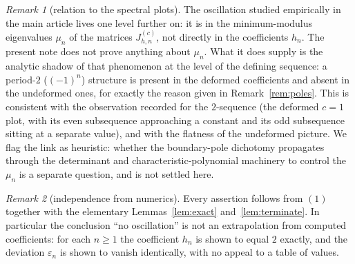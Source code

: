 \documentclass[11pt, fleqn]{amsart}
\theoremstyle{remark}
\newtheorem{remark}{Remark}
\begin{document}
\begin{remark}[relation to the spectral plots]\label{rem:spectral}
The oscillation studied empirically in the main article lives one level further on: it
is in the minimum-modulus eigenvalues $\mu_n$ of the matrices $J^{(c)}_{h,n}$, not
directly in the coefficients $h_n$. The present note does not prove anything about
$\mu_n$. What it does supply is the analytic shadow of that phenomenon at the level of
the defining sequence: a period-$2$ ($(-1)^n$) structure is present in the deformed
coefficients and absent in the undeformed ones, for exactly the reason given in
Remark~\ref{rem:poles}. This is consistent with the observation recorded for the
$2$-sequence (the deformed $c=1$ plot, with its even subsequence approaching a constant
and its odd subsequence sitting at a separate value), and with the flatness of the
undeformed picture. We flag the link as heuristic: whether the boundary-pole dichotomy
propagates through the determinant and characteristic-polynomial machinery to control the
$\mu_n$ is a separate question, and is not settled here.
\end{remark}

\begin{remark}[independence from numerics]\label{rem:numerics}
Every assertion follows from $(1)$ together with the elementary
Lemmas~\ref{lem:exact} and~\ref{lem:terminate}. In particular the conclusion ``no
oscillation'' is not an extrapolation from computed coefficients: for each $n\ge1$ the
coefficient $h_n$ is shown to equal $2$ exactly, and the deviation $\varepsilon_n$ is
shown to vanish identically, with no appeal to a table of values.
\end{remark}
\end{document}
